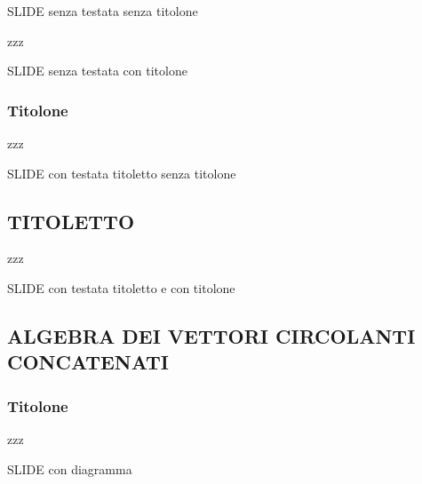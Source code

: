 SLIDE senza testata senza titolone

\thispagestyle{empty}
\begin{frame}
   \vspace{-1.5cm}
   zzz
\end{frame}

SLIDE senza testata con titolone

\thispagestyle{empty}
\begin{frame}
   \vspace{-1.5cm}
   \frametitle{Titolone}
   zzz
\end{frame}

SLIDE con testata titoletto senza titolone
\subsection{TITOLETTO}
\begin{frame}
   zzz
\end{frame}

SLIDE con testata titoletto e con titolone
\subsection{ALGEBRA DEI VETTORI CIRCOLANTI CONCATENATI}
\begin{frame}
  \frametitle{Titolone}
  zzz
\end{frame}

SLIDE con diagramma

\begin{frame}
   \begin{center}
   \end{center}
\end{frame}

